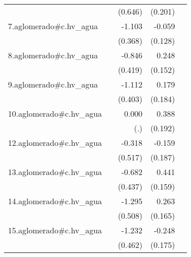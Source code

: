 {\begin{longtable}{l*{4}{D{.}{.}{-1}}}
            &                     &     (0.646)         &     (0.201)         &                     \\
\addlinespace
7.aglomerado#c.hv\_agua&                     &      -1.103\sym{**} &      -0.059         &                     \\
            &                     &     (0.368)         &     (0.128)         &                     \\
\addlinespace
8.aglomerado#c.hv\_agua&                     &      -0.846\sym{*}  &       0.248         &                     \\
            &                     &     (0.419)         &     (0.152)         &                     \\
\addlinespace
9.aglomerado#c.hv\_agua&                     &      -1.112\sym{**} &       0.179         &                     \\
            &                     &     (0.403)         &     (0.184)         &                     \\
\addlinespace
10.aglomerado#c.hv\_agua&                     &       0.000         &       0.388\sym{*}  &                     \\
            &                     &         (.)         &     (0.192)         &                     \\
\addlinespace
12.aglomerado#c.hv\_agua&                     &      -0.318         &      -0.159         &                     \\
            &                     &     (0.517)         &     (0.187)         &                     \\
\addlinespace
13.aglomerado#c.hv\_agua&                     &      -0.682         &       0.441\sym{**} &                     \\
            &                     &     (0.437)         &     (0.159)         &                     \\
\addlinespace
14.aglomerado#c.hv\_agua&                     &      -1.295\sym{*}  &       0.263         &                     \\
            &                     &     (0.508)         &     (0.165)         &                     \\
\addlinespace
15.aglomerado#c.hv\_agua&                     &      -1.232\sym{**} &      -0.248         &                     \\
            &                     &     (0.462)         &     (0.175)         &                     \\

\end{longtable}}
